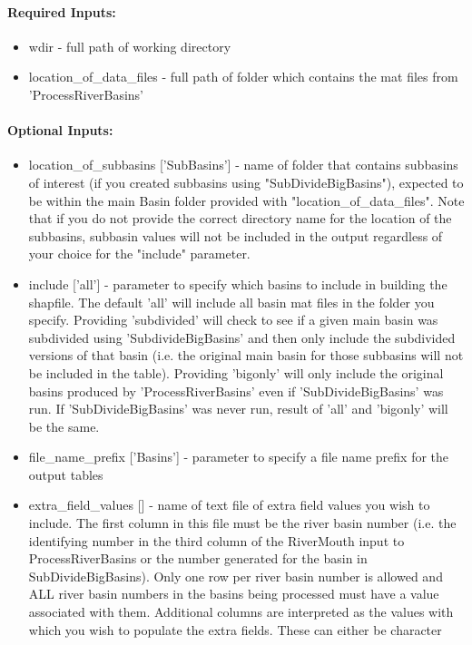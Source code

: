 \paragraph{Required Inputs:}
\begin{itemize}
\item wdir - full path of working directory
\item location\_of\_data\_files - full path of folder which contains the mat files from 'ProcessRiverBasins'
\end{itemize}

\paragraph{Optional Inputs:}
\begin{itemize}
\item location\_of\_subbasins ['SubBasins'] - name of folder that contains subbasins of interest (if you created subbasins using
"SubDivideBigBasins"), expected to be within the main Basin folder provided with "location\_of\_data\_files". Note that if you do not provide
the correct directory name for the location of the subbasins, subbasin values will not be included in the output regardless of your choice
for the "include" parameter.
\item include ['all'] - parameter to specify which basins to include in building the shapfile. The default 'all' will include all basin mat files in the 
folder you specify. Providing 'subdivided' will check to see if a given main basin was subdivided using 'SubdivideBigBasins' and then only include 
the subdivided versions of that basin (i.e. the original main basin for those subbasins will not be included in the table). Providing 'bigonly'
will only include the original basins produced by 'ProcessRiverBasins' even if 'SubDivideBigBasins' was run. If 'SubDivideBigBasins' was never run,
result of 'all' and 'bigonly' will be the same.
\item file\_name\_prefix ['Basins'] - parameter to specify a file name prefix for the output tables 
\item extra\_field\_values [] - name of text file of extra field values you wish to include. The first column in this file must be the river basin number
(i.e. the identifying number in the third column of the RiverMouth input to ProcessRiverBasins or the number generated for the basin in
SubDivideBigBasins). Only one row per river basin number is allowed and ALL river basin numbers in the basins being processed must have a value
associated with them. Additional columns are interpreted as the values with which you wish to populate the extra fields. These can either be character

\end{itemize}

